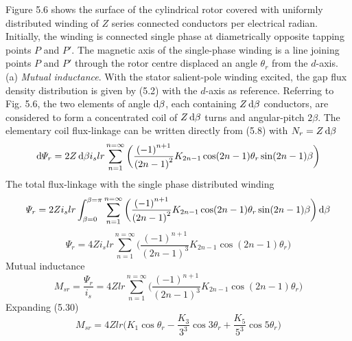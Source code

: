 \documentclass[a4paper,numbers=noenddot,12pt]{scrbook}
\begin{document}
Figure 5.6 shows the surface of the cylindrical rotor covered with uniformly distributed winding of $Z$ series connected conductors per electrical radian. Initially, the winding is connected single phase at diametrically opposite tapping points $P$ and $P'$. The magnetic axis of the single-phase winding is a line joining points $P$ and $P'$ through the rotor centre displaced an angle $\theta_r$ from the $d$-axis.
\noindent
(a) \textit{Mutual inductance}. With the stator salient-pole winding excited, the gap flux density distribution is given by (5.2) with the $d$-axis as reference. Referring to Fig. 5.6, the two elements of angle $\dif \beta$, each containing $Z \dif \beta$ conductors, are considered to form a concentrated coil of $Z \dif \beta$ turns and angular-pitch $2 \beta$. The elementary coil flux-linkage can be written directly from (5.8) with $N_r = Z \dif \beta$ 
\begin{equation}
    \dif \varPsi_r = 2 Z \dif \beta i_s l r \displaystyle \sum_{n = 1}^{n = \infty}\bigg( \frac{{(-1)}^{n + 1}}{{(2n - 1)}^2} K_{2n - 1} \cos(2n -1)\theta_r \sin(2n - 1) \beta \bigg)
\end{equation}
The total flux-linkage with the single phase distributed winding
\begin{equation}
    \varPsi_r = 2Z i_s l r \int_{\beta = 0}^{\beta=\pi} \displaystyle \sum_{n = 1}^{n = \infty} \bigg( \frac{{(-1)}^{n + 1}}{{(2n - 1)}^2} K_{2n - 1} \cos(2n -1)\theta_r \sin(2n - 1) \beta \bigg)\dif \beta
\end{equation}
\begin{equation}
    \varPsi_r = 4Z i_s l r \displaystyle \sum_{n = 1}^{n = \infty} \bigg( \frac{{(-1)}^{n + 1}}{{(2n - 1)}^3} K_{2n - 1} \cos(2n -1)\theta_r \bigg)
\end{equation}
Mutual inductance
\begin{equation}
    M_{sr} = \frac{\varPsi_r}{i_s} = 4 Z l r \displaystyle \sum_{n = 1}^{n = \infty} \bigg( \frac{{(-1)}^{n + 1}}{{(2n - 1)}^3} K_{2n - 1} \cos(2n -1)\theta_r \bigg)
\end{equation}
Expanding (5.30)
\begin{equation}
    M_{sr} = 4 Z l r \bigg( K_{1} \cos \theta_r -  \frac{K_{3}}{3^3} \cos 3 \theta_r + \frac{K_{5}}{5^3} \cos 5 \theta_r\bigg)
\end{equation}
\end{document}
